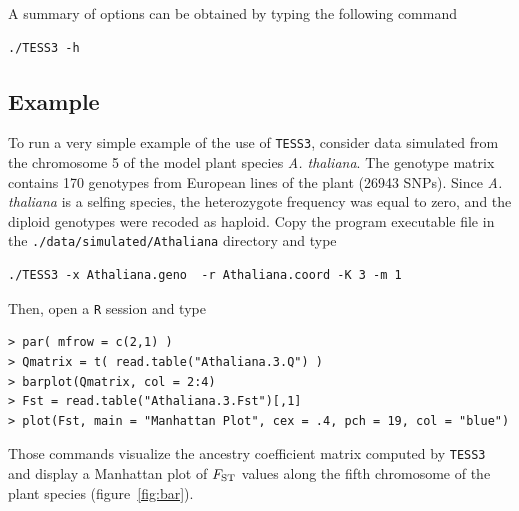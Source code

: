\documentclass[10pt,a4paper]{article}
\begin{document}
\noindent A summary of options can be obtained  by typing the following command
\footnotesize
\begin{Verbatim}[frame=single]
./TESS3 -h
\end{Verbatim}
\noindent
\normalsize


\subsection{Example}\label{sec:ex}

To run a very simple example of the use of {\tt TESS3}, consider data simulated 
from the chromosome 5 of the model plant species {\it A. thaliana}. The genotype 
matrix contains 170 genotypes from European lines of the plant (26943 SNPs). 
Since {\it A. thaliana} is a selfing species, the heterozygote frequency was 
equal to zero, and the diploid genotypes were recoded as haploid. Copy the 
program executable file in the {\tt ./data/simulated/Athaliana} directory and 
type

\begin{Verbatim}[frame=single]
./TESS3 -x Athaliana.geno  -r Athaliana.coord -K 3 -m 1
\end{Verbatim}

\noindent Then, open a {\tt R} session and type


\begin{Verbatim}[frame=single]
> par( mfrow = c(2,1) )
> Qmatrix = t( read.table("Athaliana.3.Q") )
> barplot(Qmatrix, col = 2:4)
> Fst = read.table("Athaliana.3.Fst")[,1]
> plot(Fst, main = "Manhattan Plot", cex = .4, pch = 19, col = "blue")
\end{Verbatim}

Those commands visualize the ancestry coefficient matrix computed by {\tt TESS3} 
and display a Manhattan plot of $F_{\rm ST}$ values along the fifth chromosome 
of the plant species (figure~\ref{fig:bar}).
\end{document}

